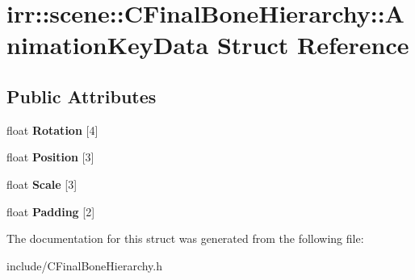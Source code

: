 \hypertarget{structirr_1_1scene_1_1CFinalBoneHierarchy_1_1AnimationKeyData}{}\section{irr\+:\+:scene\+:\+:C\+Final\+Bone\+Hierarchy\+:\+:Animation\+Key\+Data Struct Reference}
\label{structirr_1_1scene_1_1CFinalBoneHierarchy_1_1AnimationKeyData}
\subsection*{Public Attributes}
\begin{DoxyCompactItemize}
\item 
float {\bfseries Rotation} \mbox{[}4\mbox{]}\hypertarget{structirr_1_1scene_1_1CFinalBoneHierarchy_1_1AnimationKeyData_a287da301232e3c560af353708fcdc397}{}\label{structirr_1_1scene_1_1CFinalBoneHierarchy_1_1AnimationKeyData_a287da301232e3c560af353708fcdc397}

\item 
float {\bfseries Position} \mbox{[}3\mbox{]}\hypertarget{structirr_1_1scene_1_1CFinalBoneHierarchy_1_1AnimationKeyData_a131562b3b08e2d46f923b4b65124f7f4}{}\label{structirr_1_1scene_1_1CFinalBoneHierarchy_1_1AnimationKeyData_a131562b3b08e2d46f923b4b65124f7f4}

\item 
float {\bfseries Scale} \mbox{[}3\mbox{]}\hypertarget{structirr_1_1scene_1_1CFinalBoneHierarchy_1_1AnimationKeyData_a2874d18ad97e00032e4827fde90b0251}{}\label{structirr_1_1scene_1_1CFinalBoneHierarchy_1_1AnimationKeyData_a2874d18ad97e00032e4827fde90b0251}

\item 
float {\bfseries Padding} \mbox{[}2\mbox{]}\hypertarget{structirr_1_1scene_1_1CFinalBoneHierarchy_1_1AnimationKeyData_a3a2c8e12e0f29d6f8679f8049f64d6b0}{}\label{structirr_1_1scene_1_1CFinalBoneHierarchy_1_1AnimationKeyData_a3a2c8e12e0f29d6f8679f8049f64d6b0}

\end{DoxyCompactItemize}


The documentation for this struct was generated from the following file\+:\begin{DoxyCompactItemize}
\item 
include/C\+Final\+Bone\+Hierarchy.\+h\end{DoxyCompactItemize}
